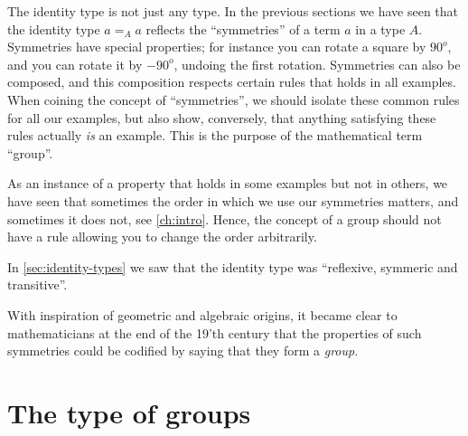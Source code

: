 \label{ch:groups}



The identity type is not just any type.  In the previous sections we have seen that the identity type $a=_Aa$ reflects the ``symmetries'' of a term $a$ in a type $A$.  Symmetries have special properties; for instance you can rotate a square by $90^o$, and you can rotate it by $-90^o$, undoing the first rotation.
Symmetries can also be composed, and this composition respects certain rules that holds in all examples.  When coining the concept of ``symmetries'', we should isolate these common rules for all our examples, but also show, conversely, that anything satisfying these rules actually \emph{is} an example.  This is the purpose of the mathematical term ``group''.

As an instance of a property that holds in some examples but not in others, we have seen that sometimes the order in which we use our symmetries matters, and sometimes it does not, see \cref{ch:intro}.  Hence, the concept of a group should not have a rule allowing you to change the order arbitrarily.

In \cref{sec:identity-types} we saw that the identity type was ``reflexive, symmeric and transitive''.

With inspiration of geometric and algebraic origins, it became clear to mathematicians at the end of the 19'th century that the properties of such symmetries could be codified by saying that they form a \emph{group}.
\section{The type of groups}
\label{sec:typegroup}

